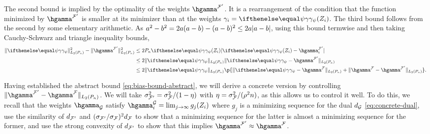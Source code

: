 The second bound is implied by the optimality of the weights $\hgamma^{\F'}$. It is a rearrangement of the 
condition that the function minimized by $\hgamma^{\F'}$ is smaller at its minimizer than at the weights $\gamma_i = \riesz[\psi](Z_i)$.
The third bound follows from the second by some elementary arithmetic. As $a^2-b^2=2a(a-b) - (a-b)^2 \le 2a\lvert a-b\rvert$,
using this bound termwise and then taking Cauchy-Schwarz and triangle inequality bounds,
\begin{align*}
\norm{\riesz[\psi]}_{L_2(\Pn)}^2 - \norm{\hgamma^{\F'}}_{L_2(\Pn)}^2 
&\le 2\Pn \riesz[\psi](Z_i) \abs{\riesz[\psi](Z_i) - \hgamma^{\F'}_i} \\
&\le 2\norm{\riesz[\psi]}_{L_2(\Pn)}\norm{\riesz[\psi]-\hgamma^{\F'}}_{L_2(\Pn)} \\
&\le 2\norm{\riesz[\psi]}_{L_2(\Pn)}\p{\norm{\riesz[\psi] - \hgamma^{\F}}_{L_2(\Pn)}  + \norm{\hgamma^{\F} - \hgamma^{\F'}}_{L_2(\Pn)}}.
\end{align*}

Having established the abstract bound \eqref{eq:bias-bound-abstract}, we will derive a concrete version
by controlling $\norm{\hgamma^{\F'}-\hgamma^{\F}}_{L_2(\Pn)}$.
We will take $\sigma_{\mathcal{F}'}^2 = \sigma_{\mathcal{F}}^2 / (1 - \eta)$ with $\eta = \sigma_{\mathcal{F}}^2/(\rho^2 n)$,
as this allows us to control it well. To do this, we recall that the weights $\hgamma_{\GG}$ satisfy
$\hgamma_i^{\GG}=\lim_{j \to \infty}g_j(Z_i)$ where $g_j$ is a minimizing sequence for the dual $d_{\mathcal{G}}$ \eqref{eq:concrete-dual},
use the similarity of $d_{\mathcal{F}'}$ and $(\sigma_{\mathcal{F}'}/\sigma_{\mathcal{F}})^2 d_{\mathcal{F}}$ to show that a minimizing sequence for the latter
is almost a minimizing sequence for the former, and use the strong convexity of $d_{\mathcal{F}'}$ 
to show that this implies $\hgamma^{\F'} \approx \hgamma^{\F}$. 


